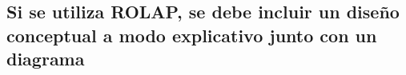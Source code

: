 \medskip
\subsection{Si se utiliza ROLAP, se debe incluir un diseño conceptual a modo explicativo junto con un diagrama}
